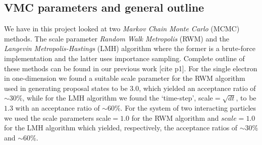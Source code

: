 \subsection{VMC parameters and general outline}
We have in this project looked at two \textit{Markov Chain Monte Carlo} (MCMC) methods. The scale parameter \textit{Random Walk Metropolis} (RWM) and the \textit{Langevin Metropolis-Hastings} (LMH) algorithm where the former is a brute-force implementation and the latter uses importance sampling. Complete outline of these methods can be found in our previous work [cite p1]. For the single electron in one-dimension we found a suitable scale parameter for the RWM algorithm used in generating proposal states to be $3.0$, which yielded an acceptance ratio of $\sim 30\%$, while for the LMH algorithm we found the `time-step', scale$=\sqrt{dt}$, to be $1.3$ with an acceptance ratio of $\sim 60\%$. For the system of two interacting particles we used the scale parameters scale$=1.0$ for the RWM algorithm and $scale=1.0$ for the LMH algorithm which yielded, respectively, the acceptance ratios of $\sim 30\%$ and $\sim60\%$. 

